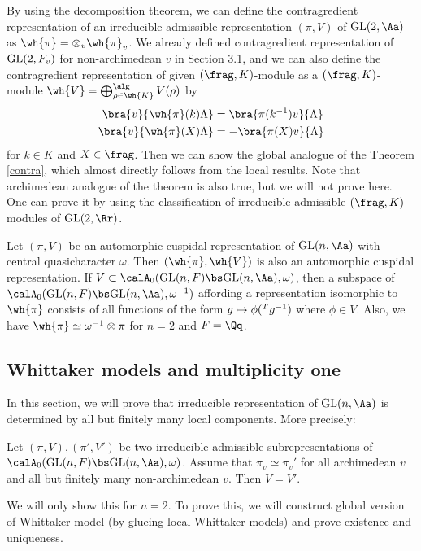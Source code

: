 By using the decomposition theorem, we can define the contragredient representation of an irreducible admissible representation $(\pi, V)$ of $\GL(2, \Aa)$ as $\wh{\pi} = \otimes_{v} \wh{\pi}_v$. 
We already defined contragredient representation of $\mathrm{GL}(2, F_{v})$ for non-archimedean $v$ in Section 3.1, and we can also define the contragredient representation of given $(\frag, K)$-module as a $(\frag, K)$-module $\wh{V} = \bigoplus_{\rho\in \wh{K}}^{\alg}V(\rho)$ by 
\begin{align*}
\bra{v}{\wh{\pi}(k)\Lambda} &= \bra{\pi(k^{-1})v}{\Lambda} \\
\bra{v}{\wh{\pi}(X)\Lambda} &= -\bra{\pi(X)v}{\Lambda} 
\end{align*}
for $k\in K$ and $X\in \frag$. 
Then we can show the global analogue of the Theorem \ref{contra}, which almost directly follows from the local results. 
Note that archimedean analogue of the theorem is also true, but we will not prove here. One can prove it by using the classification of irreducible admissible $(\frag, K)$-modules of $\GL(2, \Rr)$. 
\begin{proposition}
Let $(\pi, V)$ be an automorphic cuspidal representation of $\GL(n, \Aa)$ with central quasicharacter $\omega$. 
Then $(\wh{\pi}, \wh{V})$ is also an automorphic cuspidal representation. 
If $V\subset \calA_{0}(\GL(n, F)\bs\GL(n, \Aa), \omega)$, then a subspace of $\calA_{0}(\GL(n, F)\bs\GL(n, \Aa), \omega^{-1})$ affording a representation isomorphic to $\wh{\pi}$ consists of all functions of the form $g\mapsto \phi(\prescript{T}{}{g}^{-1})$ where $\phi\in V$. 
Also, we have $\wh{\pi} \simeq \omega^{-1}\otimes \pi$ for $n = 2$ and $F = \Qq$. 
\end{proposition}





\subsection{Whittaker models and multiplicity one} 

In this section, we will prove that irreducible representation of $\GL(n, \Aa)$ is determined by all but finitely many local components. More precisely:
\begin{theorem}
\label{multone}
Let $(\pi, V), (\pi', V')$ be two irreducible admissible subrepresentations of $\calA_{0}(\GL(n, F)\bs \GL(n, \Aa), \omega)$. 
Assume that $\pi_{v} \simeq \pi_{v}'$ for all archimedean $v$ and all but finitely many non-archimedean $v$. 
Then $V = V'$. 
\end{theorem}
We will only show this for $n = 2$. 
To prove this, we will construct global version of Whittaker model (by glueing local Whittaker models) and prove existence and uniqueness. 

